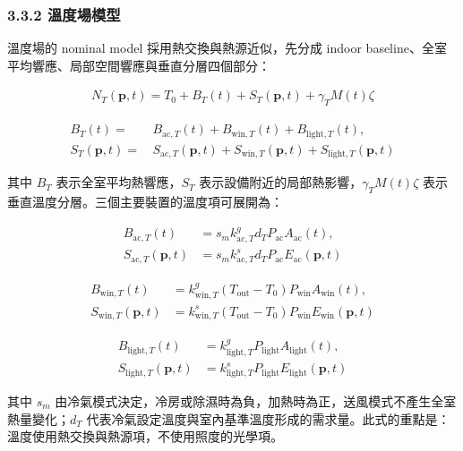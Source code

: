 \documentclass[12pt,a4paper]{article}
\begin{document}
\subsubsection*{3.3.2 溫度場模型}

溫度場的 nominal model 採用熱交換與熱源近似，先分成 indoor baseline、全室平均響應、局部空間響應與垂直分層四個部分：


\[
\begin{aligned}N_T(\mathbf{p},t)=T_0+B_T(t)+S_T(\mathbf{p},t)+\gamma_T M(t)\zeta\end{aligned}
\]

\[
\begin{aligned}B_T(t)=&\,B_{\mathrm{ac},T}(t)+B_{\mathrm{win},T}(t)+B_{\mathrm{light},T}(t),\\S_T(\mathbf{p},t)=&\,S_{\mathrm{ac},T}(\mathbf{p},t)+S_{\mathrm{win},T}(\mathbf{p},t)+S_{\mathrm{light},T}(\mathbf{p},t)\end{aligned}
\]

其中 $B_T$ 表示全室平均熱響應，$S_T$ 表示設備附近的局部熱影響，$\gamma_T M(t)\zeta$ 表示垂直溫度分層。三個主要裝置的溫度項可展開為：


\[
\begin{aligned}B_{\mathrm{ac},T}(t)&=s_m k_{\mathrm{ac},T}^{g}d_TP_{\mathrm{ac}}A_{\mathrm{ac}}(t),\\S_{\mathrm{ac},T}(\mathbf{p},t)&=s_m k_{\mathrm{ac},T}^{s}d_TP_{\mathrm{ac}}E_{\mathrm{ac}}(\mathbf{p},t)\end{aligned}
\]

\[
\begin{aligned}B_{\mathrm{win},T}(t)&=k_{\mathrm{win},T}^{g}(T_{\mathrm{out}}-T_0)P_{\mathrm{win}}A_{\mathrm{win}}(t),\\S_{\mathrm{win},T}(\mathbf{p},t)&=k_{\mathrm{win},T}^{s}(T_{\mathrm{out}}-T_0)P_{\mathrm{win}}E_{\mathrm{win}}(\mathbf{p},t)\end{aligned}
\]

\[
\begin{aligned}B_{\mathrm{light},T}(t)&=k_{\mathrm{light},T}^{g}P_{\mathrm{light}}A_{\mathrm{light}}(t),\\S_{\mathrm{light},T}(\mathbf{p},t)&=k_{\mathrm{light},T}^{s}P_{\mathrm{light}}E_{\mathrm{light}}(\mathbf{p},t)\end{aligned}
\]

其中 $s_m$ 由冷氣模式決定，冷房或除濕時為負，加熱時為正，送風模式不產生全室熱量變化；$d_T$ 代表冷氣設定溫度與室內基準溫度形成的需求量。此式的重點是：溫度使用熱交換與熱源項，不使用照度的光學項。
\end{document}
